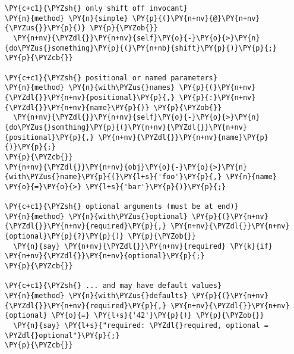 \begin{Verbatim}[commandchars=\\\{\}]
\PY{c+c1}{\PYZsh{} only shift off invocant}
\PY{n}{method} \PY{n}{simple} \PY{p}{(}\PY{n+nv}{@}\PY{n+nv}{\PYZus{}}\PY{p}{)} \PY{p}{\PYZob{}}
  \PY{n+nv}{\PYZdl{}}\PY{n+nv}{self}\PY{o}{-}\PY{o}{>}\PY{n}{do\PYZus{}something}\PY{p}{(}\PY{n+nb}{shift}\PY{p}{)}\PY{p}{;}
\PY{p}{\PYZcb{}}

\PY{c+c1}{\PYZsh{} positional or named parameters}
\PY{n}{method} \PY{n}{with\PYZus{}names} \PY{p}{(}\PY{n+nv}{\PYZdl{}}\PY{n+nv}{positional}\PY{p}{,} \PY{p}{:}\PY{n+nv}{\PYZdl{}}\PY{n+nv}{name}\PY{p}{)} \PY{p}{\PYZob{}}
  \PY{n+nv}{\PYZdl{}}\PY{n+nv}{self}\PY{o}{-}\PY{o}{>}\PY{n}{do\PYZus{}somthing}\PY{p}{(}\PY{n+nv}{\PYZdl{}}\PY{n+nv}{positional}\PY{p}{,} \PY{n+nv}{\PYZdl{}}\PY{n+nv}{name}\PY{p}{)}\PY{p}{;}
\PY{p}{\PYZcb{}}
\PY{n+nv}{\PYZdl{}}\PY{n+nv}{obj}\PY{o}{-}\PY{o}{>}\PY{n}{with\PYZus{}name}\PY{p}{(}\PY{l+s}{'foo'}\PY{p}{,} \PY{n}{name} \PY{o}{=}\PY{o}{>} \PY{l+s}{'bar'}\PY{p}{)}\PY{p}{;}

\PY{c+c1}{\PYZsh{} optional arguments (must be at end)}
\PY{n}{method} \PY{n}{with\PYZus{}optional} \PY{p}{(}\PY{n+nv}{\PYZdl{}}\PY{n+nv}{required}\PY{p}{,} \PY{n+nv}{\PYZdl{}}\PY{n+nv}{optional}\PY{p}{?}\PY{p}{)} \PY{p}{\PYZob{}}
  \PY{n}{say} \PY{n+nv}{\PYZdl{}}\PY{n+nv}{required} \PY{k}{if} \PY{n+nv}{\PYZdl{}}\PY{n+nv}{optional}\PY{p}{;}
\PY{p}{\PYZcb{}}

\PY{c+c1}{\PYZsh{} ... and may have default values}
\PY{n}{method} \PY{n}{with\PYZus{}defaults} \PY{p}{(}\PY{n+nv}{\PYZdl{}}\PY{n+nv}{required}\PY{p}{,} \PY{n+nv}{\PYZdl{}}\PY{n+nv}{optional} \PY{o}{=} \PY{l+s}{'42'}\PY{p}{)} \PY{p}{\PYZob{}}
  \PY{n}{say} \PY{l+s}{"required: \PYZdl{}required, optional = \PYZdl{}optional"}\PY{p}{;} 
\PY{p}{\PYZcb{}}
\end{Verbatim}
